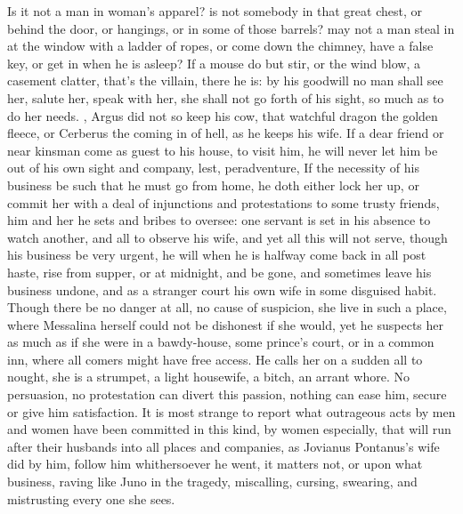 Is it not a man in woman's apparel? is not somebody in that great
chest, or behind the door, or hangings, or in some of those barrels?
may not a man steal in at the window with a ladder of ropes, or come
down the chimney, have a false key, or get in when he is asleep? If a
mouse do but stir, or the wind blow, a casement clatter, that's the
villain, there he is: by his goodwill no man shall see her, salute her,
speak with her, she shall not go forth of his sight, so much as to do
her needs. , \etc{} Argus did not so keep his
cow, that watchful dragon the golden fleece, or Cerberus the coming in
of hell, as he keeps his wife. If a dear friend or near kinsman come as
guest to his house, to visit him, he will never let him be out of his
own sight and company, lest, peradventure, \etc{} If the necessity of his
business be such that he must go from home, he doth either lock her up,
or commit her with a deal of injunctions and protestations to some
trusty friends, him and her he sets and bribes to oversee: one servant
is set in his absence to watch another, and all to observe his wife,
and yet all this will not serve, though his business be very urgent, he
will when he is halfway come back in all post haste, rise from supper,
or at midnight, and be gone, and sometimes leave his business undone,
and as a stranger court his own wife in some disguised habit. Though
there be no danger at all, no cause of suspicion, she live in such a
place, where Messalina herself could not be dishonest if she would, yet
he suspects her as much as if she were in a bawdy-house, some prince's
court, or in a common inn, where all comers might have free access. He
calls her on a sudden all to nought, she is a strumpet, a light
housewife, a bitch, an arrant whore. No persuasion, no protestation can
divert this passion, nothing can ease him, secure or give him
satisfaction. It is most strange to report what outrageous acts by men
and women have been committed in this kind, by women especially, that
will run after their husbands into all places and companies, as
Jovianus Pontanus's wife did by him, follow him whithersoever he went,
it matters not, or upon what business, raving like Juno in the tragedy,
miscalling, cursing, swearing, and mistrusting every one she sees.

